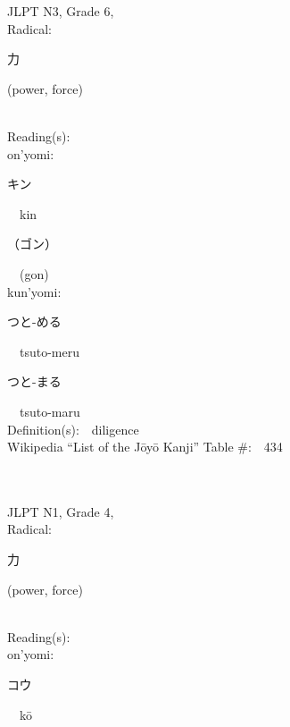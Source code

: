 \begin{multicols}{2}
{JLPT N3, Grade 6, \\Radical:\ \ {\begin{CJK}{UTF8}{min} 力 \end{CJK}} (power, force) } \\
Reading(s):\ \ \\
{\hspace*{1em}}on'yomi:\ \ \\
{\hspace*{2em}}{\begin{CJK}{UTF8}{min} キン \end{CJK}}\ \ kin\ \ \\
{\hspace*{2em}}{\begin{CJK}{UTF8}{min} （ゴン） \end{CJK}}\ \ (gon)\ \ \\
{\hspace*{1em}}kun'yomi:\ \ \\
{\hspace*{2em}}{\begin{CJK}{UTF8}{min} つと-める \end{CJK}}\ \ tsuto-meru\ \ \\
{\hspace*{2em}}{\begin{CJK}{UTF8}{min} つと-まる \end{CJK}}\ \ tsuto-maru\ \ \\
Definition(s):\ \ diligence \\
Wikipedia ``List of the J\=oy\=o Kanji'' Table \#:\ \ 434 \\
\ \ \\
{\fontsize{34pt}{40pt}  }\ \ \\  %
{JLPT N1, Grade 4, \\Radical:\ \ {\begin{CJK}{UTF8}{min} 力 \end{CJK}} (power, force) } \\
Reading(s):\ \ \\
{\hspace*{1em}}on'yomi:\ \ \\
{\hspace*{2em}}{\begin{CJK}{UTF8}{min} コウ \end{CJK}}\ \ k\=o\ \ \\

\end{multicols}
